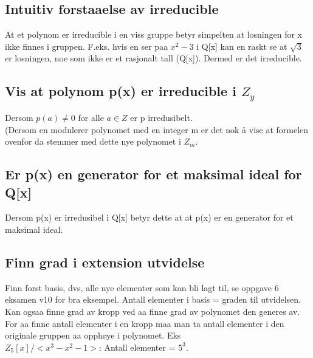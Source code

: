 \documentclass[12pt,a4paper]{article}
\begin{document}
\subsection*{Intuitiv forstaaelse av irreducible}
At et polynom er irreducible i en viss gruppe betyr simpelten at losningen for x ikke finnes i gruppen. F.eks. hvis en ser paa $x^2 - 3$ i Q[x] kan en raskt se at $\sqrt{3}$ er losningen, noe som ikke er et rasjonalt tall (Q[x]). Dermed er det irreducible. 

\subsection*{Vis at polynom p(x) er irreducible i $Z_y$}
Dersom $p(a) \neq 0$ for alle $a \in Z$ er p irredusibelt. \\
(Dersom en modulerer polynomet med en integer m er det nok å vise at formelen ovenfor da stemmer med dette nye polynomet i $Z_m$.


\subsection*{Er p(x) en generator for et maksimal ideal for Q[x]}
Dersom p(x) er irredusibel i Q[x] betyr dette at at p(x) er en generator for et maksimal ideal. 

\subsection*{Finn grad i extension utvidelse}
Finn forst basis, dvs, alle nye elementer som kan bli lagt til, se oppgave 6 eksamen v10 for bra eksempel. Antall elementer i basis = graden til utvidelsen.\\

Kan ogsaa finne grad av kropp ved aa finne grad av polynomet den generes av. \\
For aa finne antall elementer i en kropp maa man ta antall elementer i den originale gruppen aa opphøye i polynomet. Eks\\
$Z_5 [x] / <x^3 -x^2 - 1>$: Antall elementer = $5^3$. 
\end{document}
